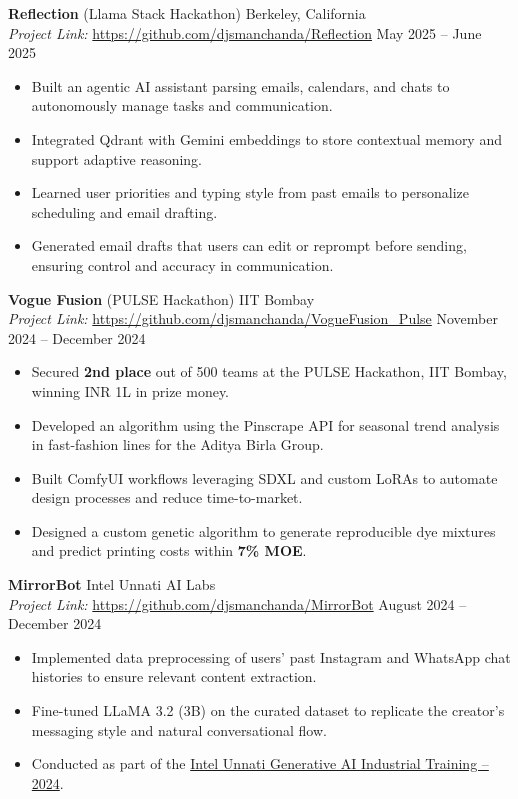 \documentclass[a4paper,9pt]{extarticle}
\begin{document}
\vspace{0.2em}

\noindent
\textbf{Reflection} (Llama Stack Hackathon) \hfill Berkeley, California\\
\textit{Project Link:} \url{https://github.com/djsmanchanda/Reflection} \hfill May 2025 – June 2025
\begin{itemize}
    \item Built an agentic AI assistant parsing emails, calendars, and chats to autonomously manage tasks and communication.
    \item Integrated Qdrant with Gemini embeddings to store contextual memory and support adaptive reasoning.
    \item Learned user priorities and typing style from past emails to personalize scheduling and email drafting.
    \item Generated email drafts that users can edit or reprompt before sending, ensuring control and accuracy in communication.
\end{itemize}

\vspace{0.2em}

\noindent
\textbf{Vogue Fusion} (PULSE Hackathon) \hfill IIT Bombay\\
\textit{Project Link:} \url{https://github.com/djsmanchanda/VogueFusion_Pulse} \hfill November 2024 – December 2024
\begin{itemize}
    \item Secured \textbf{2nd place} out of 500 teams at the PULSE Hackathon, IIT Bombay, winning INR 1L in prize money.
    \item Developed an algorithm using the Pinscrape API for seasonal trend analysis in fast-fashion lines for the Aditya Birla Group.
    \item Built ComfyUI workflows leveraging SDXL and custom LoRAs to automate design processes and reduce time-to-market.
    \item Designed a custom genetic algorithm to generate reproducible dye mixtures and predict printing costs within \textbf{7\% MOE}.
\end{itemize}

\vspace{0.2em}

\noindent
\textbf{MirrorBot} \hfill Intel Unnati AI Labs\\
\textit{Project Link:} \url{https://github.com/djsmanchanda/MirrorBot} \hfill August 2024 – December 2024
\begin{itemize}
    \item Implemented data preprocessing of users' past Instagram and WhatsApp chat histories to ensure relevant content extraction.
    \item Fine-tuned LLaMA 3.2 (3B) on the curated dataset to replicate the creator's messaging style and natural conversational flow.
    \item Conducted as part of the \href{https://drive.google.com/file/d/19qXnH3R2kTSqghv5wdkE-2p2tb6FoV1I}{Intel Unnati Generative AI Industrial Training – 2024}.
\end{itemize}
\end{document}
